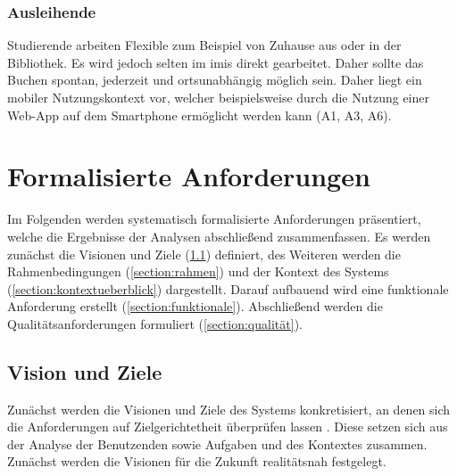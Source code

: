\subsubsection{Ausleihende}
Studierende arbeiten Flexible zum Beispiel von Zuhause aus oder in der Bibliothek. Es wird jedoch
selten im \ac{imis} direkt gearbeitet. Daher sollte das Buchen spontan, jederzeit und ortsunabhängig
möglich sein. Daher liegt ein mobiler Nutzungskontext vor, welcher beispielsweise durch die Nutzung
einer Web-App auf dem Smartphone ermöglicht werden kann (A1, A3, A6).


\section{Formalisierte Anforderungen}
\label{section:anforderung}

Im Folgenden werden systematisch formalisierte Anforderungen präsentiert, welche die Ergebnisse der
Analysen abschließend zusammenfassen. Es werden zunächst die Visionen und Ziele
(\ref{section:visionziel}) definiert, des Weiteren werden die Rahmenbedingungen
(\ref{section:rahmen}) und der Kontext des Systems (\ref{section:kontextueberblick}) dargestellt.
Darauf aufbauend wird eine funktionale Anforderung erstellt (\ref{section:funktionale}).
Abschließend werden die Qualitätsanforderungen formuliert (\ref{section:qualität}).


\subsection{Vision und Ziele}
\label{section:visionziel}
Zunächst werden die Visionen und Ziele des Systems konkretisiert, an denen sich die Anforderungen
auf Zielgerichtetheit überprüfen lassen \cite{balzert2009}. Diese setzen sich aus der Analyse der
Benutzenden sowie Aufgaben und des Kontextes zusammen. Zunächst werden die Visionen für die Zukunft
realitätsnah festgelegt.

